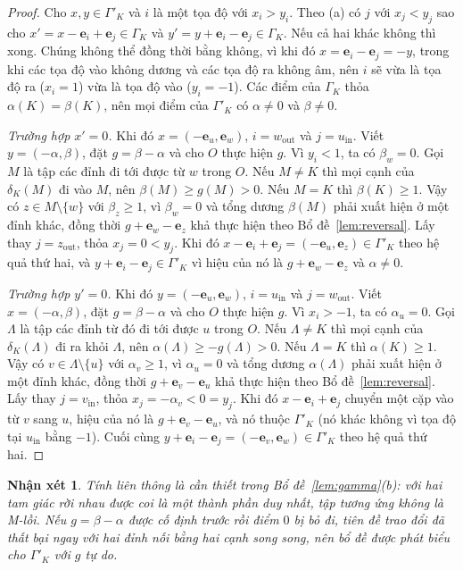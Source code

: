 \documentclass[pdflatex,sn-mathphys-num]{sn-jnl}
\theoremstyle{thmstyleone}
\theoremstyle{thmstyletwo}
\newtheorem{remark}{Nhận xét}
\theoremstyle{thmstylethree}
\newcommand{\e}{\mathbf{e}}
\newcommand{\out}{\mathrm{out}}
\newcommand{\inn}{\mathrm{in}}
\begin{document}
\begin{proof}
Cho $x,y\in\Gamma'_K$ và $i$ là một tọa độ với $x_i>y_i$. Theo (a) có $j$ với $x_j<y_j$ sao cho $x'=x-\e_i+\e_j\in\Gamma_K$ và $y'=y+\e_i-\e_j\in\Gamma_K$. Nếu cả hai khác không thì xong. Chúng không thể đồng thời bằng không, vì khi đó $x=\e_i-\e_j=-y$, trong khi các tọa độ vào không dương và các tọa độ ra không âm, nên $i$ sẽ vừa là tọa độ ra ($x_i=1$) vừa là tọa độ vào ($y_i=-1$). Các điểm của $\Gamma_K$ thỏa $\alpha(K)=\beta(K)$, nên mọi điểm của $\Gamma'_K$ có $\alpha\ne0$ và $\beta\ne0$.

\emph{Trường hợp $x'=0$.} Khi đó $x=(-\e_u,\e_w)$, $i=w_{\out}$ và $j=u_{\inn}$. Viết $y=(-\alpha,\beta)$, đặt $g=\beta-\alpha$ và cho $O$ thực hiện $g$. Vì $y_i<1$, ta có $\beta_w=0$. Gọi $M$ là tập các đỉnh đi tới được từ $w$ trong $O$. Nếu $M\ne K$ thì mọi cạnh của $\delta_K(M)$ đi vào $M$, nên $\beta(M)\ge g(M)>0$. Nếu $M=K$ thì $\beta(K)\ge1$. Vậy có $z\in M\setminus\{w\}$ với $\beta_z\ge1$, vì $\beta_w=0$ và tổng dương $\beta(M)$ phải xuất hiện ở một đỉnh khác, đồng thời $g+\e_w-\e_z$ khả thực hiện theo Bổ đề~\ref{lem:reversal}. Lấy thay $j=z_{\out}$, thỏa $x_j=0<y_j$. Khi đó $x-\e_i+\e_j=(-\e_u,\e_z)\in\Gamma'_K$ theo hệ quả thứ hai, và $y+\e_i-\e_j\in\Gamma'_K$ vì hiệu của nó là $g+\e_w-\e_z$ và $\alpha\ne0$.

\emph{Trường hợp $y'=0$.} Khi đó $y=(-\e_u,\e_w)$, $i=u_{\inn}$ và $j=w_{\out}$. Viết $x=(-\alpha,\beta)$, đặt $g=\beta-\alpha$ và cho $O$ thực hiện $g$. Vì $x_i>-1$, ta có $\alpha_u=0$. Gọi $\Lambda$ là tập các đỉnh từ đó đi tới được $u$ trong $O$. Nếu $\Lambda\ne K$ thì mọi cạnh của $\delta_K(\Lambda)$ đi ra khỏi $\Lambda$, nên $\alpha(\Lambda)\ge-g(\Lambda)>0$. Nếu $\Lambda=K$ thì $\alpha(K)\ge1$. Vậy có $v\in\Lambda\setminus\{u\}$ với $\alpha_v\ge1$, vì $\alpha_u=0$ và tổng dương $\alpha(\Lambda)$ phải xuất hiện ở một đỉnh khác, đồng thời $g+\e_v-\e_u$ khả thực hiện theo Bổ đề~\ref{lem:reversal}. Lấy thay $j=v_{\inn}$, thỏa $x_j=-\alpha_v<0=y_j$. Khi đó $x-\e_i+\e_j$ chuyển một cặp vào từ $v$ sang $u$, hiệu của nó là $g+\e_v-\e_u$, và nó thuộc $\Gamma'_K$ (nó khác không vì tọa độ tại $u_{\inn}$ bằng $-1$). Cuối cùng $y+\e_i-\e_j=(-\e_v,\e_w)\in\Gamma'_K$ theo hệ quả thứ hai.
\end{proof}

\begin{remark}\label{rem:connected}
Tính liên thông là cần thiết trong Bổ đề~\ref{lem:gamma}(b): với hai tam giác rời nhau được coi là một thành phần duy nhất, tập tương ứng không là M-lồi. Nếu $g=\beta-\alpha$ được cố định trước rồi điểm $0$ bị bỏ đi, tiên đề trao đổi đã thất bại ngay với hai đỉnh nối bằng hai cạnh song song, nên bổ đề được phát biểu cho $\Gamma'_K$ với $g$ tự do.
\end{remark}
\end{document}
